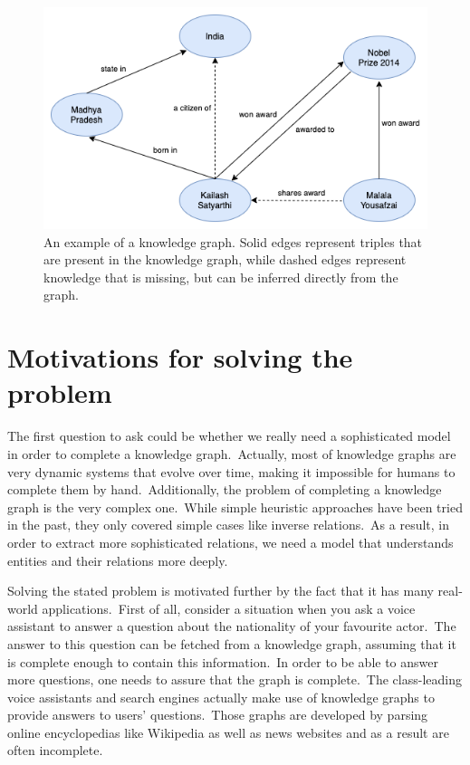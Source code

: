 \documentclass[longabstract, english, mgr]{iithesis}
\theoremstyle{default_theorem_style}\newtheorem{theorem}{Theorem}
\theoremstyle{default_theorem_style}\newtheorem{definition}{Definition}
\begin{document}
\begin{figure}[H]
\centering
\includegraphics[scale=0.6]{knowledge_graph}
\caption{An example of a knowledge graph. Solid edges represent triples that are present in the knowledge graph, while
dashed edges represent knowledge that is missing, but can be inferred directly from the graph.}
\label{fig:knowledge_graph}
\end{figure}


\section{Motivations for solving the problem}

The first question to ask could be whether we really need a sophisticated model in order to complete a knowledge
graph.\ Actually, most of knowledge graphs are very dynamic systems that evolve over time, making it impossible for
humans to complete them by hand.\ Additionally, the problem of completing a knowledge graph is the very complex
one.\ While simple heuristic approaches have been tried in the past, they only covered simple cases like inverse
relations.\ As a result, in order to extract more sophisticated relations, we need a model that understands
entities and their relations more deeply.\newline

\noindent Solving the stated problem is motivated further by the fact that it has many real-world
applications.\ First of all, consider a situation when you ask a voice assistant to answer a question about the
nationality of your favourite actor.\ The answer to this question can be fetched from a knowledge graph, assuming that
it is complete enough to contain this information.\ In order to be able to answer more questions, one needs to assure
that the graph is complete.\ The class-leading voice assistants and search engines actually make use
of knowledge graphs to provide answers to users' questions.\ Those graphs are developed by parsing online
encyclopedias like Wikipedia as well as news websites and as a result are often incomplete.\newline
\end{document}
